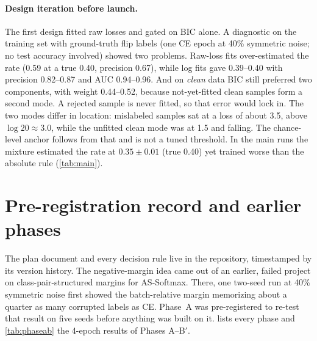 \paragraph{Design iteration before launch.}
The first design fitted raw losses and gated on BIC alone. A diagnostic on the training set with
ground-truth flip labels (one CE epoch at 40\% symmetric noise; no test accuracy involved) showed
two problems. Raw-loss fits over-estimated the rate (0.59 at a true 0.40, precision 0.67), while log
fits gave 0.39--0.40 with precision 0.82--0.87 and AUC 0.94--0.96. And on \emph{clean} data BIC
still preferred two components, with weight 0.44--0.52, because not-yet-fitted clean samples form
a second mode. A rejected sample is never fitted, so that error would lock in. The two modes differ
in location: mislabeled samples sat at a loss of about 3.5, above $\log 20 \approx 3.0$, while the
unfitted clean mode was at 1.5 and falling. The chance-level anchor follows from that and is not a
tuned threshold. In the main runs the mixture estimated the rate at $0.35 \pm 0.01$ (true 0.40) yet
trained worse than the absolute rule (\cref{tab:main}).

\section{Pre-registration record and earlier phases}
\label{app:prereg}

The plan document and every decision rule live in the repository, timestamped by its version
history. The negative-margin idea came out of an earlier, failed project on class-pair-structured
margins for AS-Softmax. There, one two-seed run at 40\% symmetric noise first showed the
batch-relative margin memorizing about a quarter as many corrupted labels as CE. Phase~A was
pre-registered to re-test that result on five seeds before anything was built on it.
 lists every phase and \cref{tab:phaseab} the 4-epoch results of Phases A--B$'$.

